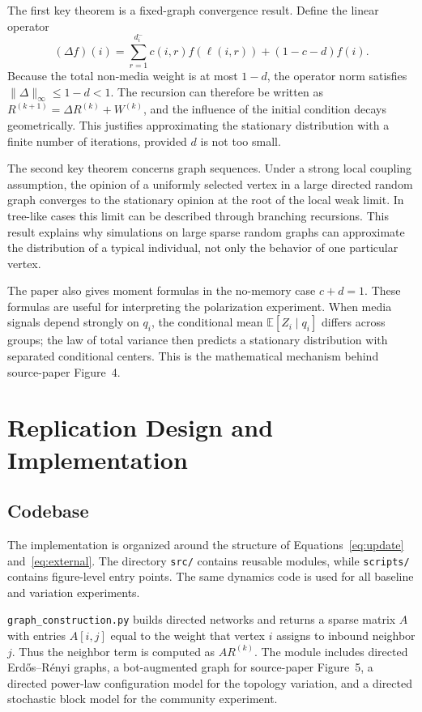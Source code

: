\documentclass[11pt]{article}
\begin{document}
The first key theorem is a fixed-graph convergence result.  Define the linear
operator
\[
(\Delta f)(i)=\sum_{r=1}^{d_i^-}c(i,r)f(\ell(i,r))+(1-c-d)f(i).
\]
Because the total non-media weight is at most $1-d$, the operator norm satisfies
$\|\Delta\|_\infty\leq1-d<1$.  The recursion can therefore be written as
$R^{(k+1)}=\Delta R^{(k)}+W^{(k)}$, and the influence of the initial condition
decays geometrically.  This justifies approximating the stationary distribution
with a finite number of iterations, provided $d$ is not too small.

The second key theorem concerns graph sequences.  Under a strong local coupling
assumption, the opinion of a uniformly selected vertex in a large directed
random graph converges to the stationary opinion at the root of the local weak
limit.  In tree-like cases this limit can be described through branching
recursions.  This result explains why simulations on large sparse random graphs
can approximate the distribution of a typical individual, not only the behavior
of one particular vertex.

The paper also gives moment formulas in the no-memory case $c+d=1$.  These
formulas are useful for interpreting the polarization experiment.  When media
signals depend strongly on $q_i$, the conditional mean
$\mathbb{E}[Z_i\mid q_i]$ differs across groups; the law of total variance then
predicts a stationary distribution with separated conditional centers.  This is
the mathematical mechanism behind source-paper Figure~4.

\section{Replication Design and Implementation}
\label{sec:methods}

\subsection{Codebase}

The implementation is organized around the structure of
Equations~\eqref{eq:update} and~\eqref{eq:external}.  The directory
\texttt{src/} contains reusable modules, while \texttt{scripts/} contains
figure-level entry points.  The same dynamics code is used for all baseline and
variation experiments.

\texttt{graph\_construction.py} builds directed networks and returns a sparse
matrix $A$ with entries $A[i,j]$ equal to the weight that vertex $i$ assigns to
inbound neighbor $j$.  Thus the neighbor term is computed as $A R^{(k)}$.  The
module includes directed Erd\H{o}s--R\'enyi graphs, a bot-augmented graph for
source-paper Figure~5, a directed power-law configuration model for the topology
variation, and a directed stochastic block model for the community experiment.
\end{document}

